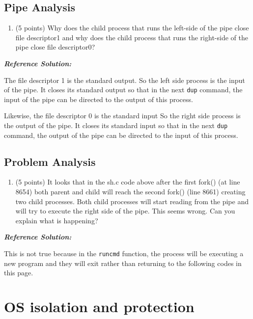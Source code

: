 \documentclass[]{article}
\providecommand{\tightlist}{%
  \setlength{\itemsep}{0pt}\setlength{\parskip}{0pt}}
\begin{document}
\hypertarget{pipe-analysis}{%
\subsection{Pipe Analysis}\label{pipe-analysis}}

\begin{enumerate}
\def\labelenumi{(\alph{enumi})}
\tightlist
\item
  (5 points) Why does the child process that runs the left-side of the
  pipe close file descriptor1 and why does the child process that runs
  the right-side of the pipe close file descriptor0?
\end{enumerate}

\textbf{\emph{Reference Solution:}}

The file descriptor 1 is the standard output. So the left side process
is the input of the pipe. It closes its standard output so that in the
next \texttt{dup} command, the input of the pipe can be directed to the
output of this process.

Likewise, the file descriptor 0 is the standard input So the right side
process is the output of the pipe. It closes its standard input so that
in the next \texttt{dup} command, the output of the pipe can be directed
to the input of this process.

\hypertarget{problem-analysis}{%
\subsection{Problem Analysis}\label{problem-analysis}}

\begin{enumerate}
\def\labelenumi{(\alph{enumi})}
\setcounter{enumi}{1}
\tightlist
\item
  (5 points) It looks that in the sh.c code above after the first fork()
  (at line 8654) both parent and child will reach the second fork()
  (line 8661) creating two child processes. Both child processes will
  start reading from the pipe and will try to execute the right side of
  the pipe. This seems wrong. Can you explain what is happening?
\end{enumerate}

\textbf{\emph{Reference Solution:}}

This is not true because in the \texttt{runcmd} function, the process
will be executing a new program and they will exit rather than returning
to the following codes in this page.

\hypertarget{os-isolation-and-protection}{%
\section{OS isolation and
protection}\label{os-isolation-and-protection}}
\end{document}

